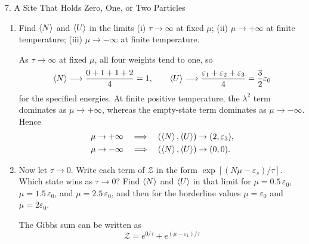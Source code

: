 \documentclass[11pt]{article}
\begin{document}
\begin{problem}{7. A Site That Holds Zero, One, or Two Particles}
\begin{enumerate}[label=(\alph*)]
\begin{answer}
\begin{equation}
\begin{aligned}
\ev U&=\frac{\varepsilon_1\lambda e^{-\varepsilon_1/\tau}
+\varepsilon_2\lambda e^{-\varepsilon_2/\tau}
+\varepsilon_3\lambda^2e^{-\varepsilon_3/\tau}}{\mathcal Z}.
\end{aligned}
\end{equation}
Direct differentiation verifies
\begin{equation}
\label{eq:p7-derivative-check}
\lambda\frac{\partial\log\mathcal Z}{\partial\lambda}
=\frac{\lambda}{\mathcal Z}\left(e^{-\varepsilon_1/\tau}
+e^{-\varepsilon_2/\tau}+2\lambda e^{-\varepsilon_3/\tau}\right)=\ev N.
\end{equation}
\end{answer}
\item Find \(\ev{N}\) and \(\ev{U}\) in the limits (i) \(\tau\to\infty\) at fixed \(\mu\); (ii) \(\mu\to+\infty\) at finite temperature; (iii) \(\mu\to-\infty\) at finite temperature.
  \begin{answer}
As \(\tau\to\infty\) at fixed \(\mu\), all four weights tend to one, so
\begin{equation}
\label{eq:p7-high-temperature}
\ev N\longrightarrow\frac{0+1+1+2}{4}=1,
\qquad \ev U\longrightarrow\frac{\varepsilon_1+\varepsilon_2+\varepsilon_3}{4}
=\frac32\varepsilon_0
\end{equation}
for the specified energies. At finite positive temperature, the \(\lambda^2\) term dominates as \(\mu\to+\infty\), whereas the empty-state term dominates as \(\mu\to-\infty\). Hence
\begin{equation}
\label{eq:p7-extreme-mu}
\begin{aligned}
\mu\to+\infty&\quad\Longrightarrow\quad(\ev N,\ev U)\to(2,\varepsilon_3),\\
\mu\to-\infty&\quad\Longrightarrow\quad(\ev N,\ev U)\to(0,0).
\end{aligned}
\end{equation}
\end{answer}
\item Now let \(\tau\to0\).
  Write each term of \(\mathcal{Z}\) in the form \(\exp[(N\mu-\varepsilon_s)/\tau]\).
  Which state wins as \(\tau\to0\)?
  Find \(\ev{N}\) and \(\ev{U}\) in that limit for \(\mu=0.5\,\varepsilon_0\), \(\mu=1.5\,\varepsilon_0\), and \(\mu=2.5\,\varepsilon_0\), and then for the borderline values \(\mu=\varepsilon_0\) and \(\mu=2\varepsilon_0\).
  \begin{answer}
The Gibbs sum can be written as
\begin{equation}
\label{eq:p7-low-temperature-weights}
\mathcal Z=e^{0/\tau}+e^{(\mu-\varepsilon_1)/\tau}

\end{equation}
\end{answer}
\end{enumerate}
\end{problem}
\end{document}

